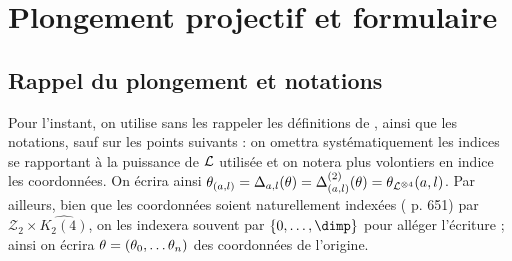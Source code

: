 
\chapter{Plongement projectif et formulaire} \label{chap:plong-mm}

\section{Rappel du plongement et notations} \label{sec:plong-mm-def}

\later Pour l'instant, on utilise sans les rappeler les définitions de
\cite{daphimhsvva2}, ainsi que les notations, sauf sur les points suivants : on
omettra systématiquement les indices se rapportant à la puissance de
\( \mathcal L \) utilisée et on notera plus volontiers en indice les coordonnées.
On écrira ainsi $\theta_{(a, l)} = \Delta_{a, l}(\theta)  = \Delta_{(a,
  l)}^{(2)}(\theta) = \theta_{\mathcal L^{\otimes 4}}(a, l)$. Par ailleurs, bien
que les coordonnées soient naturellement indexées ( p. 651) par
$\mathcal{Z}_2 \times \widehat{K_2(4)}$, on les indexera souvent par $\{0,
  \dots, \dimp\}$ pour alléger l'écriture  ; ainsi on écrira $\theta = (\theta_0,
\dots \theta_n)$ des coordonnées de l'origine.

\endinput

